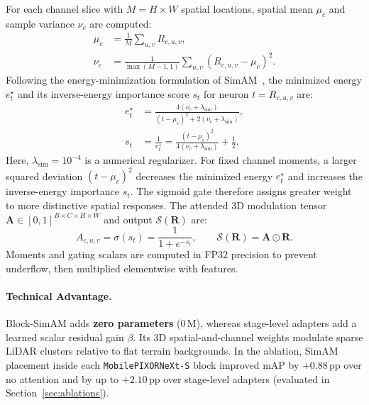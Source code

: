 For each channel slice with $M = H \times W$ spatial locations, spatial mean $\mu_c$ and sample variance $\nu_c$ are computed:
\begin{equation}
    \begin{aligned}
        \mu_c &= \frac{1}{M}\sum_{u, v} R_{c, u, v}, \\
        \nu_c &= \frac{1}{\max(M-1, 1)}\sum_{u, v} (R_{c, u, v} - \mu_c)^2.
    \end{aligned}
    \label{eq:spatial_moments}
\end{equation}
Following the energy-minimization formulation of SimAM~\cite{yang2021simam}, the minimized energy $e_t^\star$ and its inverse-energy importance score $s_t$ for neuron $t = R_{c,u,v}$ are:
\begin{equation}
    \begin{aligned}
        e_t^\star &= \frac{4(\nu_c + \lambda_{\mathrm{sim}})}{(t-\mu_c)^2 + 2(\nu_c + \lambda_{\mathrm{sim}})}, \\
        s_t &= \frac{1}{e_t^\star} = \frac{(t - \mu_c)^2}{4(\nu_c + \lambda_{\mathrm{sim}})} + \frac{1}{2}.
    \end{aligned}
    \label{eq:simam_energy}
\end{equation}
Here, $\lambda_{\mathrm{sim}} = 10^{-4}$ is a numerical regularizer. For fixed channel moments, a larger squared deviation $(t-\mu_c)^2$ decreases the minimized energy $e_t^\star$ and increases the inverse-energy importance $s_t$. The sigmoid gate therefore assigns greater weight to more distinctive spatial responses. The attended 3D modulation tensor $\mathbf{A} \in [0, 1]^{B \times C \times H \times W}$ and output $\mathcal{S}(\mathbf{R})$ are:
\begin{equation}
    A_{c, u, v} = \sigma(s_t) = \frac{1}{1 + e^{-s_t}}, \qquad \mathcal{S}(\mathbf{R}) = \mathbf{A} \odot \mathbf{R}.
    \label{eq:simam_modulation}
\end{equation}
Moments and gating scalars are computed in FP32 precision to prevent underflow, then multiplied elementwise with features.

\paragraph{Technical Advantage.}
Block-SimAM adds \textbf{zero parameters} ($0$\,M), whereas stage-level adapters add a learned scalar residual gain $\beta$. Its 3D spatial-and-channel weights modulate sparse LiDAR clusters relative to flat terrain backgrounds. In the ablation, SimAM placement inside each \texttt{MobilePIXORNeXt-S} block improved mAP by $+0.88\,\text{pp}$ over no attention and by up to $+2.10\,\text{pp}$ over stage-level adapters (evaluated in Section~\ref{sec:ablations}).


